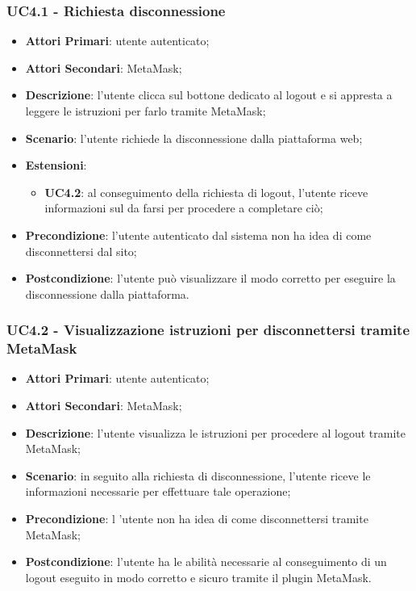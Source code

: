\subsubsection{UC4.1 - Richiesta disconnessione}
\begin{itemize}
	\item \textbf{Attori Primari}:
	utente autenticato;
	\item \textbf{Attori Secondari}:
	MetaMask\glo;
	\item \textbf{Descrizione}: l'utente clicca sul bottone dedicato al logout e si appresta a leggere le istruzioni per farlo tramite MetaMask\glo;
	\item \textbf{Scenario}: l'utente richiede la disconnessione dalla piattaforma web;
	\item \textbf{Estensioni}:
	\begin{itemize}
		\item \textbf{UC4.2}: al conseguimento della richiesta di logout, l'utente riceve informazioni sul da farsi per procedere a completare ciò;
	\end{itemize}
	\item \textbf{Precondizione}: l'utente autenticato dal sistema non ha idea di come disconnettersi dal sito;
	\item \textbf{Postcondizione}: l'utente può visualizzare il modo corretto per eseguire la disconnessione dalla piattaforma.
	
\end{itemize}
\subsubsection{UC4.2 - Visualizzazione istruzioni per disconnettersi tramite MetaMask\glo}
\begin{itemize}
	\item \textbf{Attori Primari}:
	utente autenticato;
	\item \textbf{Attori Secondari}:
	MetaMask\glo;
	\item \textbf{Descrizione}: l'utente visualizza le istruzioni per procedere al logout tramite MetaMask\glo;
	\item \textbf{Scenario}: in seguito alla richiesta di disconnessione, l'utente riceve le informazioni necessarie per effettuare tale operazione;
	\item \textbf{Precondizione}: l 'utente non ha idea di come disconnettersi tramite MetaMask\glo;
	\item \textbf{Postcondizione}: l'utente ha le abilità necessarie al conseguimento di un logout eseguito in modo corretto e sicuro tramite il plugin MetaMask\glo.
\end{itemize}


